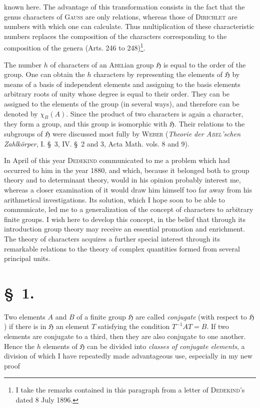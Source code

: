 \documentclass[11pt]{article}
\newcommand{\grp}{\mathfrak{H}}
\begin{document}
known here. The advantage of this transformation consists in the fact that the genus characters of \textsc{Gauss} are only relations, whereas those of \textsc{Dirichlet} are numbers with which one can calculate. Thus multiplication of these characteristic numbers replaces the composition of the characters corresponding to the composition of the genera (Arts. 246 to 248)\footnote{I take the remarks contained in this paragraph from a letter of \textsc{Dedekind}'s dated 8 July 1896.}.

The number $h$ of characters of an \textsc{Abel}ian group $\grp$ is equal to the order of the group. One can obtain the $h$ characters by representing the elements of $\grp$ by means of a basis of independent elements and assigning to the basis elements arbitrary roots of unity whose degree is equal to their order. They can be assigned to the elements of the group (in several ways), and therefore can be denoted by $\chi_B(A)$. Since the product of two characters is again a character, they form a group, and this group is isomorphic with $\grp$. Their relations to the subgroups of $\grp$ were discussed most fully by \textsc{Weber} (\emph{Theorie der \textsc{Abel}'schen Zahlkörper}, I. \S~3, IV. \S~2 and 3, Acta Math. vols. 8 and 9).

In April of this year \textsc{Dedekind} communicated to me a problem which had occurred to him in the year 1880, and which, because it belonged both to group theory and to determinant theory, would in his opinion probably interest me, whereas a closer examination of it would draw him himself too far away from his arithmetical investigations. Its solution, which I hope soon to be able to communicate, led me to a generalization of the concept of characters to arbitrary finite groups. I wish here to develop this concept, in the belief that through its introduction group theory may receive an essential promotion and enrichment. The theory of characters acquires a further special interest through its remarkable relations to the theory of complex quantities formed from several principal units.

\section*{\S~1.}

Two elements $A$ and $B$ of a finite group $\grp$ are called \emph{conjugate} (with respect to $\grp$) if there is in $\grp$ an element $T$ satisfying the condition $T^{-1}AT=B$. If two elements are conjugate to a third, then they are also conjugate to one another. Hence the $h$ elements of $\grp$ can be divided into \emph{classes of conjugate elements}, a division of which I have repeatedly made advantageous use, especially in my new proof
\end{document}
